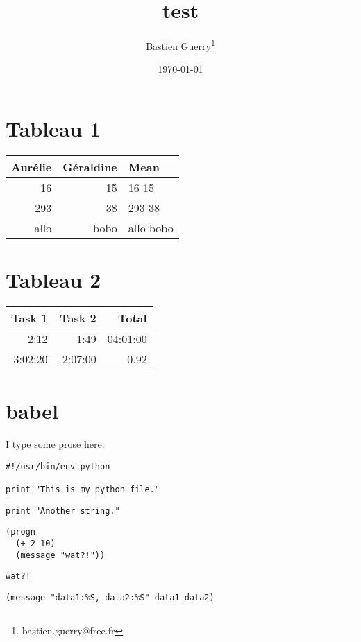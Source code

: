 \documentclass[11pt]{article}
\author{Bastien Guerry\thanks{bastien.guerry@free.fr}}
\date{\today}
\title{test}
\begin{document}
\maketitle

\section*{Tableau 1}
\label{sec:org0d624ec}

\begin{center}
\begin{tabular}{rrl}
Aurélie & Géraldine & Mean\\
\hline
16 & 15 & 16 15\\
\hline
293 & 38 & 293 38\\
allo & bobo & allo bobo\\
\end{tabular}
\end{center}

\section*{Tableau 2}
\label{sec:org24774d5}

\begin{center}
\label{tab:org73bbf73}
\begin{tabular}{rrr}
Task 1 & Task 2 & Total\\
\hline
2:12 & 1:49 & 04:01:00\\
3:02:20 & -2:07:00 & 0.92\\
\end{tabular}
\end{center}

\section*{babel}
\label{sec:org5f04520}

I type some prose here.

\lstset{language=Python,label= ,caption= ,captionpos=b,numbers=none}
\begin{lstlisting}
#!/usr/bin/env python

print "This is my python file."
\end{lstlisting}

\lstset{language=Python,label= ,caption= ,captionpos=b,numbers=none}
\begin{lstlisting}
print "Another string."
\end{lstlisting}

\lstset{language=Lisp,label=mon test elisp,caption= ,captionpos=b,numbers=none}
\begin{lstlisting}
(progn
  (+ 2 10)
  (message "wat?!"))
\end{lstlisting}

\begin{verbatim}
wat?!
\end{verbatim}

\lstset{language=Lisp,label= ,caption= ,captionpos=b,numbers=none}
\begin{lstlisting}
(message "data1:%S, data2:%S" data1 data2)
\end{lstlisting}
\end{document}
